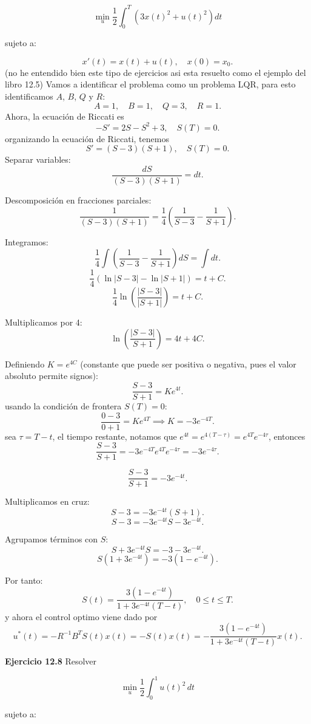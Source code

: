 \documentclass{uofa-eng-assignment}
\begin{document}
\[
\min_u \frac{1}{2} \int_0^T \left( 3x(t)^2 + u(t)^2 \right) dt
\]

sujeto a:

\[
x'(t) = x(t) + u(t), \quad x(0) = x_0.
\]
(no he entendido bien este tipo de ejercicios asi esta resuelto como el ejemplo del libro 12.5)
Vamos a identificar el problema como un problema LQR, para esto identificamos $A$, $B$, $Q$ y $R$:
\[A = 1, \quad B = 1, \quad Q = 3, \quad R = 1.\]
Ahora, la ecuación de Riccati es
\[-S' = 2S-S^2+3 , \quad S(T) = 0.\]
organizando la ecuación de Riccati, tenemos
\[S' = (S-3)(S+1), \quad S(T) = 0.\]
Separar variables:
\[
\frac{dS}{(S - 3)(S + 1)} = dt.
\]

Descomposición en fracciones parciales:
\[
\frac{1}{(S - 3)(S + 1)} = \frac{1}{4} \left( \frac{1}{S - 3} - \frac{1}{S + 1} \right).
\]

Integramos:
\[
\frac{1}{4} \int \left( \frac{1}{S - 3} - \frac{1}{S + 1} \right) dS = \int dt.
\]
\[
\frac{1}{4} \left( \ln |S - 3| - \ln |S + 1| \right) = t + C.
\]
\[
\frac{1}{4} \ln \left( \frac{|S - 3|}{|S + 1|} \right) = t + C.
\]

Multiplicamos por 4:
\[
\ln \left( \frac{|S - 3|}{S + 1} \right) = 4t + 4C.
\]

Definiendo \( K = e^{4C} \) (constante que puede ser positiva o negativa, pues el valor absoluto permite signos):
\[
\frac{S - 3}{S + 1} = K e^{4t}.
\]
usando la condición de frontera \( S(T) = 0 \):
\[\frac{0 - 3}{0 + 1} = K e^{4T} \implies K = -3 e^{-4T}.\]
sea $\tau = T - t$, el tiempo restante, notamos que $e^{4t} = e^{4(T - \tau)} = e^{4T} e^{-4\tau}$, entonces
\[\frac{S - 3}{S + 1} = -3 e^{-4T} e^{4T} e^{-4\tau} = -3 e^{-4\tau}.\]

\[
\frac{S - 3}{S + 1} = -3e^{-4t}.
\]

Multiplicamos en cruz:
\[
S - 3 = -3e^{-4t}(S + 1).
\]
\[
S - 3 = -3e^{-4t}S - 3e^{-4t}.
\]

Agrupamos términos con \(S\):
\[
S + 3e^{-4t}S = -3 - 3e^{-4t}.
\]
\[
S(1 + 3e^{-4t}) = -3(1 - e^{-4t}).
\]

Por tanto:
\[
S(t) = \frac{3(1 - e^{-4t})}{1 + 3e^{-4t}(T - t)}, \quad 0 \leq t \leq T.
\]
y ahora el control optimo viene dado por
\[u^*(t) = -R^{-1}B^TS(t)x(t) = -S(t)x(t) = -\frac{3(1 - e^{-4t})}{1 + 3e^{-4t}(T - t)}x(t).\]


\textbf{Ejercicio 12.8} Resolver

\[
\min_u \frac{1}{2} \int_0^1 u(t)^2 \, dt
\]

sujeto a:
\end{document}
